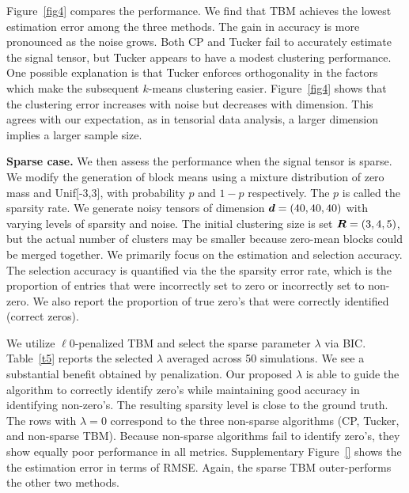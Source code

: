 \documentclass{article}
\begin{document}
Figure~\ref{fig4} compares the performance. We find that TBM achieves the lowest estimation error among the three methods. The gain in accuracy is more pronounced as the noise grows. Both CP and Tucker fail to accurately estimate the signal tensor, but Tucker appears to have a modest clustering performance. One possible explanation is that Tucker enforces orthogonality in the factors which make the subsequent $k$-means clustering easier. Figure~\ref{fig4} shows that the clustering error increases with noise but decreases with dimension. This agrees with our expectation, as in tensorial data analysis, a larger dimension implies a larger sample size. 



\textbf{Sparse case.} We then assess the performance when the signal tensor is sparse. We modify the generation of block means using a mixture distribution of zero mass and Unif[-3,3], with probability $p$ and $1-p$ respectively. The $p$ is called the sparsity rate. We generate noisy tensors of dimension $\bm{d}=(40,40,40)$ with varying levels of sparsity and noise. The initial clustering size is set $\bm{R}=(3,4,5)$, but the actual number of clusters may be smaller because zero-mean blocks could be merged together. We primarily focus on the estimation and selection accuracy. The selection accuracy is quantified via the the sparsity error rate, which is the proportion of entries that were incorrectly set to zero or incorrectly set to non-zero. We also report the proportion of true zero's that were correctly identified (correct zeros). 

We utilize $\ell0$-penalized TBM and select the sparse parameter $\lambda$ via BIC. Table~\ref{t5} reports the selected $\lambda$ averaged across 50 simulations. We see a substantial benefit obtained by penalization. Our proposed $\lambda$ is able to guide the algorithm to correctly identify zero's while maintaining good accuracy in identifying non-zero's. The resulting sparsity level is close to the ground truth. The rows with $\lambda=0$ correspond to the three non-sparse algorithms (CP, Tucker, and non-sparse TBM). Because non-sparse algorithms fail to identify zero's, they show equally poor performance in all metrics. Supplementary Figure~\ref{} shows the the estimation error in terms of RMSE. Again, the sparse TBM outer-performs the other two methods. 
\end{document}
